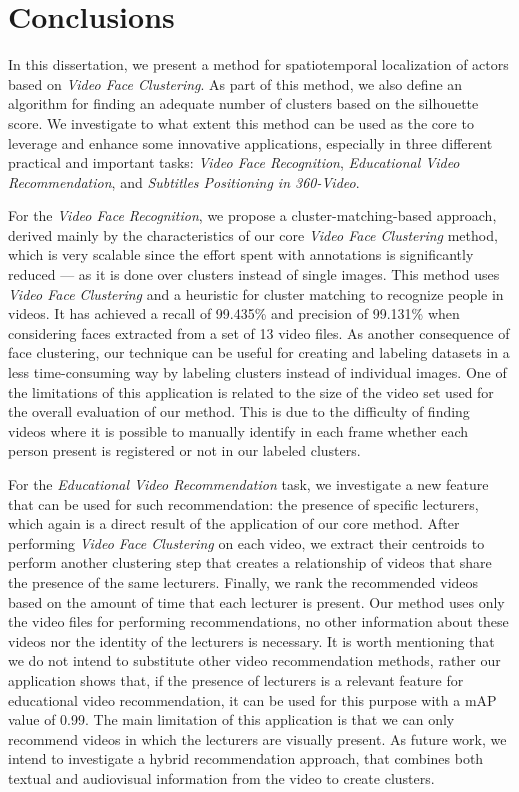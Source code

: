 \newpage

\chapter{Conclusions}
\label{chap:conclusions}

In this dissertation, we present a method for spatiotemporal localization of actors based on \emph{Video Face Clustering}. As part of this method, we also define an algorithm for finding an adequate number of clusters based on the silhouette score. We investigate to what extent this method can be used as the core to leverage and enhance some innovative applications, especially in three different practical and important tasks: \emph{Video Face Recognition}, \emph{Educational Video Recommendation}, and \emph{Subtitles Positioning in 360-Video}.

For the \emph{Video Face Recognition}, we propose a cluster-matching-based approach, derived mainly by the characteristics of our core \emph{Video Face Clustering} method, which is very scalable since the effort spent with annotations is significantly reduced --- as it is done over clusters instead of single images. This method uses \emph{Video Face Clustering} and a heuristic for cluster matching to recognize people in videos. It has achieved a recall of 99.435\% and precision of 99.131\% when considering faces extracted from a set of 13 video files. As another consequence of face clustering, our technique can be useful for creating and labeling datasets in a less time-consuming way by labeling clusters instead of individual images. One of the limitations of this application is related to the size of the video set used for the overall evaluation of our method. This is due to the difficulty of finding videos where it is possible to manually identify in each frame whether each person present is registered or not in our labeled clusters.

For the \emph{Educational Video Recommendation} task, we investigate a new feature that can be used for such recommendation: the presence of specific lecturers, which again is a direct result of the application of our core method. After performing \emph{Video Face Clustering} on each video, we extract their centroids to perform another clustering step that creates a relationship of videos that share the presence of the same lecturers. Finally, we rank the recommended videos based on the amount of time that each lecturer is present. Our method uses only the video files for performing recommendations, no other information about these videos nor the identity of the lecturers is necessary. It is worth mentioning that we do not intend to substitute other video recommendation methods, rather our application shows that, if the presence of lecturers is a relevant feature for educational video recommendation, it can be used for this purpose with a mAP value of 0.99. The main limitation of this application is that we can only recommend videos in which the lecturers are visually present. As future work, we intend to investigate a hybrid recommendation approach, that combines both textual and audiovisual information from the video to create clusters.

